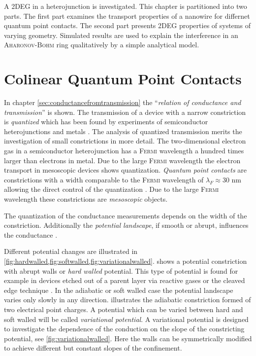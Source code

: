 A 2DEG in a heterojunction is investigated. This chapter is partitioned into two parts. The first part examines the transport properties of a nanowire for differnet quantum point contacts. The second part presents 2DEG properties of systems of varying geometry. Simulated results are used to explain the interference in an \textsc{Aharonov-Bohm} ring qualitatively by a simple analytical model.\par
\section{Colinear Quantum Point Contacts}
In chapter \ref{sec:conductancefromtransmission} the ``\emph{relation of conductance and transmission}'' \cite{landauer1996} is shown. The transmission of a device with a narrow constriction is \emph{quantized} which has been found by experiments of semiconductor heterojunctions \cite{vanHoutenBeenakker2005} and metals \cite{PhysRevB.36.1284}. The analysis of quantized transmission merits the investigation of small constrictions in more detail.
The two-dimensional electron gas in a semiconductor heterojunction has a \textsc{Fermi} wavelength a hundred times larger than electrons in metal. Due to the large \textsc{Fermi} wavelength the electron transport in mesoscopic devices shows quantization. \emph{Quantum point contacts} are constrictions with a width comparable to the \textsc{Fermi} wavelength of $\lambda_F \approx 30\text{~nm}$ allowing the direct control of the quantization \cite{vanHoutenBeenakker2005}. Due to the large \textsc{Fermi} wavelength these constrictions are \emph{mesoscopic} objects.\par
The quantization of the conductance measurements depends on the width of the constriction. Additionally the \emph{potential landscape}, if smooth or abrupt, influences the conductance \cite{PhysRevB.44.8017}.\par
Different potential changes are illustrated in \cref{fig:hardwalled,fig:softwalled,fig:variationalwalled}.  shows a potential constriction with abrupt walls or \emph{hard walled} potential. This type of potential is found for example in devices etched out of a parent layer via reactive gases or the cleaved edge technique \cite{ApplPhysLett.66.323}. In the adiabatic or soft walled case the potential landscape varies only slowly in any direction.  illustrates the adiabatic constriction formed of two electrical point charges. A potential which can be varied between hard and soft walled will be called \emph{variational potential}. A variational potential is designed to investigate the dependence of the conduction on the slope of the constricting potential, see \cref{fig:variationalwalled}. Here the walls can be symmetrically modified to achieve different but constant slopes of the confinement.
